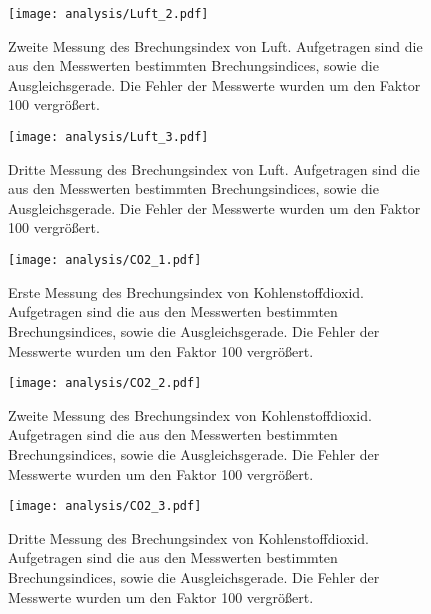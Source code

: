 \begin{figure}
  \centering
  \texttt{[image: analysis/Luft\_2.pdf]}
  \caption{Zweite Messung des Brechungsindex von Luft. Aufgetragen sind die aus
  den Messwerten bestimmten Brechungsindices, sowie die Ausgleichsgerade. Die
  Fehler der Messwerte wurden um den Faktor 100 vergrößert.}
  \label{fig:luft2}
\end{figure}

\begin{figure}
  \centering
  \texttt{[image: analysis/Luft\_3.pdf]}
  \caption{Dritte Messung des Brechungsindex von Luft. Aufgetragen sind die aus
  den Messwerten bestimmten Brechungsindices, sowie die Ausgleichsgerade. Die
  Fehler der Messwerte wurden um den Faktor 100 vergrößert.}
  \label{fig:luft3}
\end{figure}%

\begin{figure}
  \centering
  \texttt{[image: analysis/CO2\_1.pdf]}
  \caption{Erste Messung des Brechungsindex von Kohlenstoffdioxid. Aufgetragen
  sind die aus den Messwerten bestimmten Brechungsindices, sowie die
  Ausgleichsgerade. Die Fehler der Messwerte wurden um den Faktor 100
  vergrößert.}
  \label{fig:co2_1}
\end{figure}

\begin{figure}
  \centering
  \texttt{[image: analysis/CO2\_2.pdf]}
  \caption{Zweite Messung des Brechungsindex von Kohlenstoffdioxid. Aufgetragen
  sind die aus den Messwerten bestimmten Brechungsindices, sowie die
  Ausgleichsgerade. Die Fehler der Messwerte wurden um den Faktor 100
  vergrößert.}
  \label{fig:co2_2}
\end{figure}

\begin{figure}
  \centering
  \texttt{[image: analysis/CO2\_3.pdf]}
  \caption{Dritte Messung des Brechungsindex von Kohlenstoffdioxid. Aufgetragen
  sind die aus den Messwerten bestimmten Brechungsindices, sowie die
  Ausgleichsgerade. Die Fehler der Messwerte wurden um den Faktor 100
  vergrößert.}
  \label{fig:co2_3}
\end{figure}

